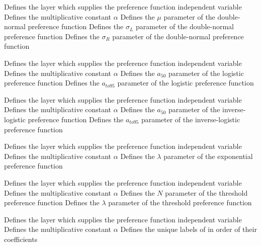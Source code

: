  {Defines the layer which supplies the preference function independent variable}
 {Defines the multiplicative constant $\alpha$}
 {Defines the $\mu$ parameter of the double-normal preference function}
 {Defines the $\sigma_L$ parameter of the double-normal preference function}
 {Defines the $\sigma_R$ parameter of the double-normal preference function}
\par\textbf{}\par
{} {Defines the layer which supplies the preference function independent variable}
 {Defines the multiplicative constant $\alpha$}
 {Defines the $a_{50}$ parameter of the logistic preference function}
 {Defines the $a_{to95}$ parameter of the logistic preference function}
\par\textbf{}\par
{} {Defines the layer which supplies the preference function independent variable}
 {Defines the multiplicative constant $\alpha$}
 {Defines the $a_{50}$ parameter of the inverse-logistic preference function}
 {Defines the $a_{to95}$ parameter of the inverse-logistic preference function}
\par\textbf{}\par
{} {Defines the layer which supplies the preference function independent variable}
 {Defines the multiplicative constant $\alpha$}
 {Defines the $\lambda$ parameter of the exponential preference function}
\par\textbf{}\par
{} {Defines the layer which supplies the preference function independent variable}
 {Defines the multiplicative constant $\alpha$}
 {Defines the $N$ parameter of the threshold preference function}
 {Defines the $\lambda$ parameter of the threshold preference function}
\par\textbf{}\par
{} {Defines the layer which supplies the preference function independent variable}
 {Defines the multiplicative constant $\alpha$}
 {Defines the unique labels of  in order of their coefficients}
